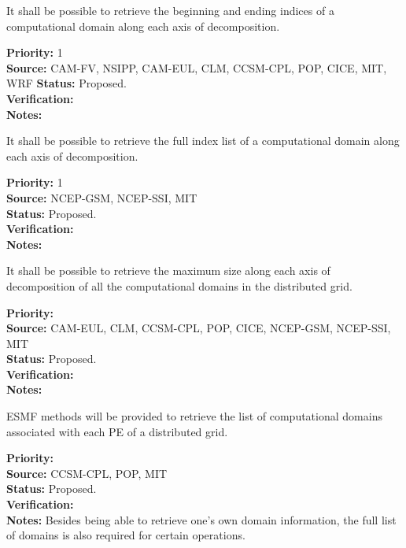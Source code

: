 
It shall be possible to retrieve the beginning and ending indices of a
computational domain along each axis of decomposition.

\begin{reqlist}
{\bf Priority:} 1 \\ 
{\bf Source:} CAM-FV, NSIPP, CAM-EUL, CLM, CCSM-CPL, POP, CICE, MIT, WRF
{\bf Status:} Proposed. \\
{\bf Verification:} \\
{\bf Notes:}
\end{reqlist}


It shall be possible to retrieve the full index list of a
computational domain along each axis of decomposition.

\begin{reqlist}
{\bf Priority:} 1 \\ 
{\bf Source:} NCEP-GSM, NCEP-SSI, MIT \\
{\bf Status:} Proposed. \\
{\bf Verification:} \\
{\bf Notes:}
\end{reqlist}


It shall be possible to retrieve the maximum size along each axis of
decomposition of all the computational domains in the distributed grid. 

\begin{reqlist}
{\bf Priority:} \\ 
{\bf Source:} CAM-EUL, CLM, CCSM-CPL, POP, CICE, NCEP-GSM, NCEP-SSI, MIT \\
{\bf Status:} Proposed. \\
{\bf Verification:} \\
{\bf Notes:}
\end{reqlist}


ESMF methods will be provided to retrieve the list of computational
domains associated with each PE of a distributed grid.

\begin{reqlist}
{\bf Priority:} \\ 
{\bf Source:} CCSM-CPL, POP, MIT \\
{\bf Status:} Proposed. \\
{\bf Verification:} \\
{\bf Notes:} Besides being able to retrieve one's own domain
  information, the full list of domains is also required for certain
  operations.
\end{reqlist}

